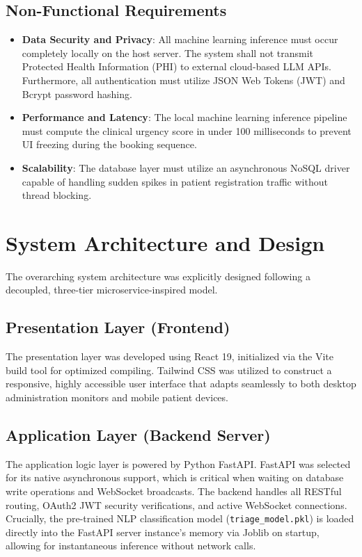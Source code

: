 \documentclass[12pt,a4paper]{report}
\begin{document}
\subsection{Non-Functional Requirements}
\begin{itemize}
    \item \textbf{Data Security and Privacy}: All machine learning inference must occur completely locally on the host server. The system shall not transmit Protected Health Information (PHI) to external cloud-based LLM APIs. Furthermore, all authentication must utilize JSON Web Tokens (JWT) and Bcrypt password hashing.
    \item \textbf{Performance and Latency}: The local machine learning inference pipeline must compute the clinical urgency score in under 100 milliseconds to prevent UI freezing during the booking sequence.
    \item \textbf{Scalability}: The database layer must utilize an asynchronous NoSQL driver capable of handling sudden spikes in patient registration traffic without thread blocking.
\end{itemize}

\section{System Architecture and Design}
The overarching system architecture was explicitly designed following a decoupled, three-tier microservice-inspired model.

\subsection{Presentation Layer (Frontend)}
The presentation layer was developed using React 19, initialized via the Vite build tool for optimized compiling. Tailwind CSS was utilized to construct a responsive, highly accessible user interface that adapts seamlessly to both desktop administration monitors and mobile patient devices.

\subsection{Application Layer (Backend Server)}
The application logic layer is powered by Python FastAPI. FastAPI was selected for its native asynchronous support, which is critical when waiting on database write operations and WebSocket broadcasts. The backend handles all RESTful routing, OAuth2 JWT security verifications, and active WebSocket connections. Crucially, the pre-trained NLP classification model (\texttt{triage\_model.pkl}) is loaded directly into the FastAPI server instance's memory via Joblib on startup, allowing for instantaneous inference without network calls.
\end{document}
